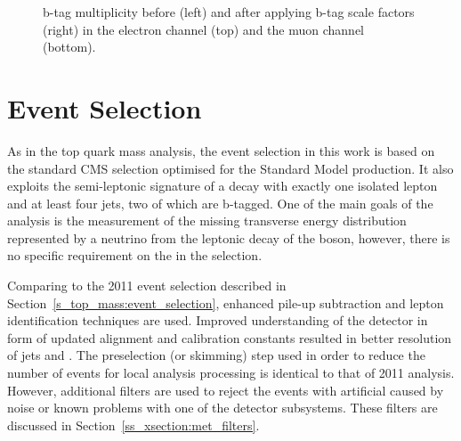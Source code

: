 \begin{figure}[!htpb]
\begin{center}
	\caption{\label{fig:bjet_weights}
    b-tag multiplicity before (left) and after applying b-tag scale factors (right) in the electron channel (top) and
    the muon channel (bottom).}
\end{center}
\end{figure}


\section{Event Selection}
\label{s_xsection:event_selection}
As in the top quark mass analysis, the event selection in this work is based on the standard CMS selection optimised for
the Standard Model \ttbar production. It also exploits the semi-leptonic signature of a \ttbar decay with exactly one
isolated lepton and at least four jets, two of which are b-tagged. One of the main goals of the analysis is the
measurement of the missing transverse energy distribution represented by a neutrino from the leptonic decay of the \W
boson, however, there is no specific requirement on the \MET in the selection.

Comparing to the 2011 event selection described in Section~\ref{s_top_mass:event_selection}, enhanced pile-up
subtraction and lepton identification techniques are used. Improved understanding of the detector in form of updated
alignment and calibration constants resulted in better resolution of jets and \MET. The preselection (or skimming) step
used in order to reduce the number of events for local analysis processing is identical to that of 2011 analysis.
However, additional filters are used to reject the events with artificial \MET caused by noise or known problems with
one of the detector subsystems. These filters are discussed in Section~\ref{ss_xsection:met_filters}.

